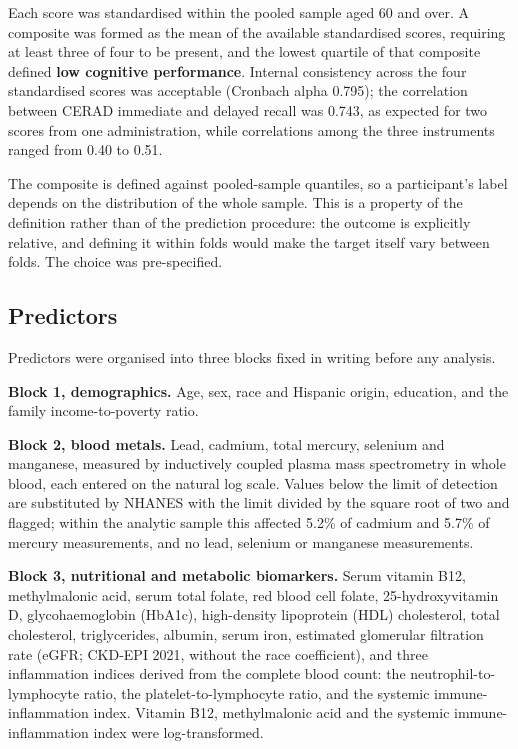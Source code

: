 \documentclass[12pt]{article}
\begin{document}
Each score was standardised within the pooled sample aged 60 and over. A composite was formed as the mean of the available standardised scores, requiring at least three of four to be present, and the lowest quartile of that composite defined \textbf{low cognitive performance}. Internal consistency across the four standardised scores was acceptable (Cronbach alpha 0.795); the correlation between CERAD immediate and delayed recall was 0.743, as expected for two scores from one administration, while correlations among the three instruments ranged from 0.40 to 0.51.

The composite is defined against pooled-sample quantiles, so a participant's label depends on the distribution of the whole sample. This is a property of the definition rather than of the prediction procedure: the outcome is explicitly relative, and defining it within folds would make the target itself vary between folds. The choice was pre-specified.

\subsection*{Predictors}

Predictors were organised into three blocks fixed in writing before any analysis.

\textbf{Block 1, demographics.} Age, sex, race and Hispanic origin, education, and the family income-to-poverty ratio.

\textbf{Block 2, blood metals.} Lead, cadmium, total mercury, selenium and manganese, measured by inductively coupled plasma mass spectrometry in whole blood, each entered on the natural log scale. Values below the limit of detection are substituted by NHANES with the limit divided by the square root of two and flagged; within the analytic sample this affected 5.2\% of cadmium and 5.7\% of mercury measurements, and no lead, selenium or manganese measurements.

\textbf{Block 3, nutritional and metabolic biomarkers.} Serum vitamin B12, methylmalonic acid, serum total folate, red blood cell folate, 25-hydroxyvitamin D, glycohaemoglobin (HbA1c), high-density lipoprotein (HDL) cholesterol, total cholesterol, triglycerides, albumin, serum iron, estimated glomerular filtration rate (eGFR; CKD-EPI 2021, without the race coefficient), and three inflammation indices derived from the complete blood count: the neutrophil-to-lymphocyte ratio, the platelet-to-lymphocyte ratio, and the systemic immune-inflammation index. Vitamin B12, methylmalonic acid and the systemic immune-inflammation index were log-transformed.
\end{document}

